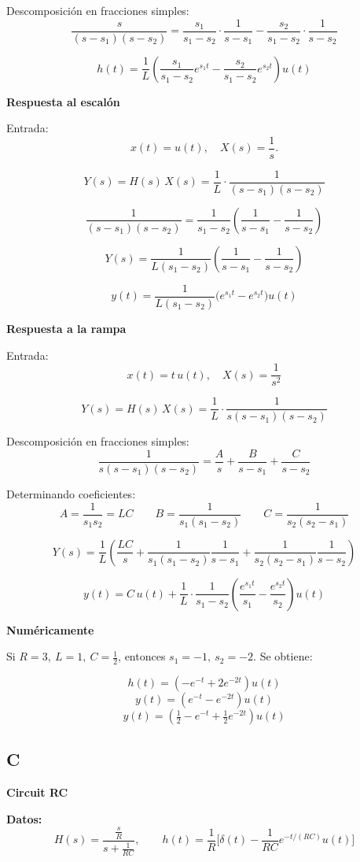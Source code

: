 Descomposición en fracciones simples:
\[
\frac{s}{(s-s_1)(s-s_2)}
=\frac{s_1}{s_1-s_2}\cdot\frac{1}{s-s_1}
-\frac{s_2}{s_1-s_2}\cdot\frac{1}{s-s_2}
\]

\[
h(t)=\frac{1}{L}\left(\frac{s_1}{s_1-s_2}e^{s_1 t}
-\frac{s_2}{s_1-s_2}e^{s_2 t}\right)u(t)
\]

\textbf{Respuesta al escalón}

Entrada:
\[
x(t)=u(t), \quad X(s)=\frac{1}{s}.
\]

\[
Y(s) = H(s)\,X(s) = \frac{1}{L}\cdot\frac{1}{(s-s_1)(s-s_2)}
\]

\[
\frac{1}{(s-s_1)(s-s_2)} = \frac{1}{s_1-s_2}\left(\frac{1}{s-s_1}-\frac{1}{s-s_2}\right)
\]

\[
Y(s) = \frac{1}{L(s_1-s_2)}\left(\frac{1}{s-s_1}-\frac{1}{s-s_2}\right)
\]

\[
y(t) = \frac{1}{L(s_1-s_2)}\Big(e^{s_1 t}-e^{s_2 t}\Big)u(t)
\]

\textbf{Respuesta a la rampa}

Entrada:
\[
x(t)=t\,u(t), \quad X(s)=\frac{1}{s^2}
\]

\[
Y(s)=H(s)\,X(s)=\frac{1}{L}\cdot\frac{1}{s(s-s_1)(s-s_2)}
\]

Descomposición en fracciones simples:
\[
\frac{1}{s(s-s_1)(s-s_2)}=\frac{A}{s}+\frac{B}{s-s_1}+\frac{C}{s-s_2}
\]

Determinando coeficientes:
\[
A=\frac{1}{s_1 s_2}=LC \qquad
B=\frac{1}{s_1(s_1-s_2)} \qquad
C=\frac{1}{s_2(s_2-s_1)}
\]

\[
Y(s)=\frac{1}{L}\left(\frac{LC}{s}+\frac{1}{s_1(s_1-s_2)}\frac{1}{s-s_1}+\frac{1}{s_2(s_2-s_1)}\frac{1}{s-s_2}\right)
\]

\[
y(t)=C\,u(t)+\frac{1}{L}\cdot\frac{1}{s_1-s_2}\left(\frac{e^{s_1 t}}{s_1}-\frac{e^{s_2 t}}{s_2}\right)u(t)
\]

\textbf{Numéricamente}

Si \(R=3,\ L=1,\ C=\tfrac{1}{2}\), entonces \(s_1=-1,\ s_2=-2\). Se obtiene:

\[
h(t)=(-e^{-t}+2e^{-2t})u(t)
\]
\[
y(t)=(e^{-t}-e^{-2t})u(t)
\]
\[
y(t)=\left(\tfrac{1}{2}-e^{-t}+\tfrac{1}{2}e^{-2t}\right)u(t)
\]

\subsection{C}

\textbf{Circuit RC}

\textbf{Datos:}
\[
H(s)=\frac{\tfrac{s}{R}}{s+\tfrac{1}{RC}},\qquad
h(t)=\frac{1}{R}\Big[\delta(t)-\frac{1}{RC}e^{-t/(RC)}u(t)\Big]
\]

